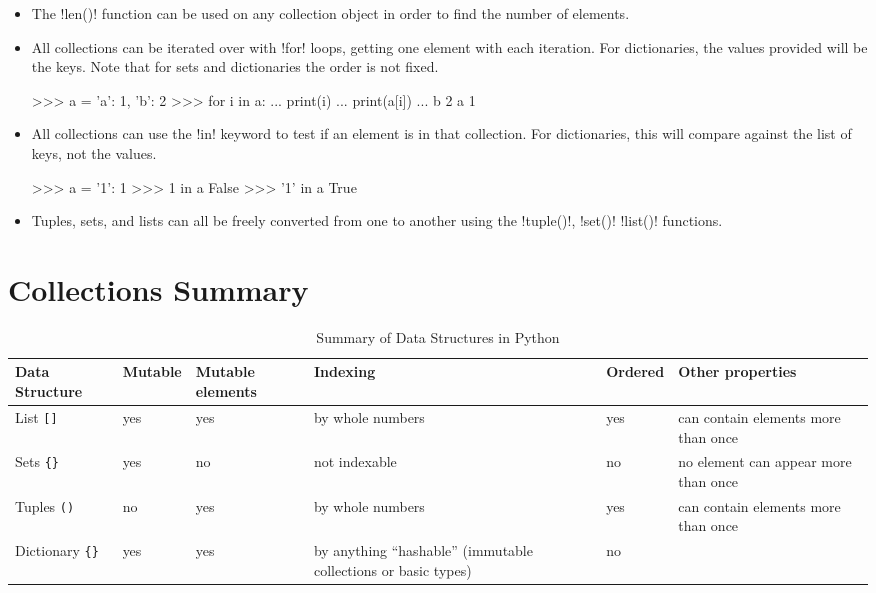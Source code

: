\documentclass[11pt]{cselabheader}
\begin{document}
\begin{itemize}
\item The \pythoninline!len()! function can be used on any collection object
  in order to find the number of elements.
\item All collections can be iterated over with \pythoninline!for! loops,
  getting one element with each iteration. For dictionaries, the values provided
  will be the keys. Note that for sets and dictionaries the order is not fixed.

  \begin{pyconcode}
>>> a = {'a': 1, 'b': 2}
>>> for i in a:
...     print(i)
...     print(a[i])
... 
b
2
a
1
  \end{pyconcode}

\item All collections can use the \pythoninline!in! keyword to test
  if an element is in that collection. For dictionaries, this will
  compare against the list of keys, not the values.
  \begin{pyconcode}
>>> a = {'1': 1}
>>> 1 in a
False
>>> '1' in a
True
  \end{pyconcode}
\item Tuples, sets, and lists can all be freely converted from one
  to another using the \pythoninline!tuple()!, \pythoninline!set()!
  \pythoninline!list()! functions.
\end{itemize}


\section{Collections Summary}

\begin{table}[!ht]
  \centering
  \begin{tabular}{p{1.6cm}lp{1.6cm}p{3.5cm}lp{4.5cm}}
    \toprule
    Data Structure & Mutable & Mutable elements & Indexing & Ordered
    & Other
    properties\\
    \midrule
    List \lstinline![]! & yes & yes & by whole numbers & yes & can contain elements more than once\\
    Sets \lstinline!{}! & yes & no & not indexable & no & no element can appear more than once\\
    Tuples \lstinline!()! & no & yes & by whole numbers & yes & can contain elements more than
    once\\
    Dictionary \lstinline!{}! & yes & yes & by anything ``hashable'' (immutable collections or
    basic types) & no & \\
    \bottomrule
  \end{tabular}
  \caption{Summary of Data Structures in Python}
  \label{tab:sum}
\end{table}
\end{document}
